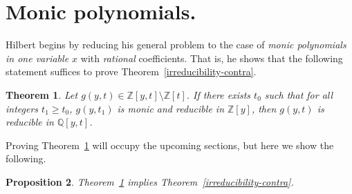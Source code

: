 \documentclass{article}
\theoremstyle{plain}
\newtheorem{thm}{Theorem}
\newtheorem{prop}[thm]{Proposition}
\theoremstyle{definition}
\renewcommand{\geq}{\geqslant}  %
\newcommand{\Que}{\mathbb{Q}}   %
\newcommand{\Zed}{\mathbb{Z}}   %
\begin{document}
 

\section{Monic polynomials.}
\label{sec:monic}
 
 
Hilbert begins by reducing his general problem to the case of
\emph{monic polynomials in one variable $x$} with \emph{rational}
coefficients. That is, he shows that the following statement suffices to prove
Theorem~\ref{irreducibility-contra}.

\begin{thm}\label{thm:goal}  %
Let $g(y,t) \in \Zed[y,t] \setminus \Zed[t]$.  If there exists $t_0$ such that for all integers $t_1 \geq t_0$, $g(y,t_1)$ is monic and reducible in $\Zed[y]$, then $g(y,t)$ is reducible in $\Que[y,t]$.
\end{thm}

\noindent
Proving Theorem~\ref{thm:goal} will occupy the upcoming sections, but here we show the following.





\begin{prop} %
\label{prop:Que2Zed}
Theorem~\ref{thm:goal} implies Theorem~\ref{irreducibility-contra}.
\end{prop}
\end{document}

